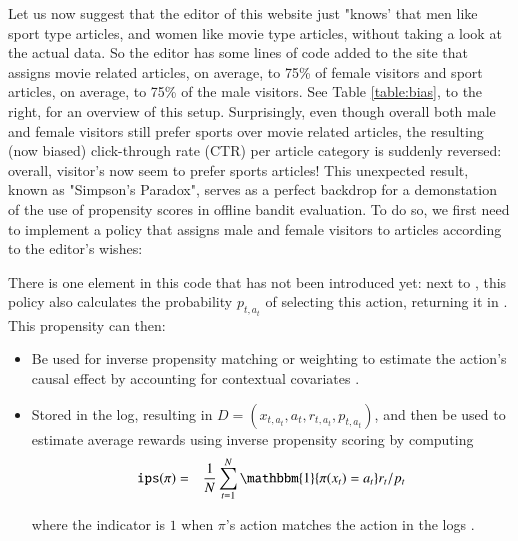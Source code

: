 \documentclass{jss}
\begin{document}
Let us now suggest that the editor of this website just "knows' that men like sport type articles, and women like movie type articles, without taking a look at the actual data. So the editor has some lines of code added to the site that assigns movie related articles, on average, to 75\% of female visitors and sport articles, on average, to 75\% of the male visitors. See Table \ref{table:bias}, to the right, for an overview of this setup. Surprisingly, even though overall both male and female visitors still prefer sports over movie related articles, the resulting (now biased) click-through rate (CTR) per article category is suddenly reversed: overall, visitor's now seem to prefer sports articles! This unexpected result, known as "Simpson's Paradox", serves as a perfect backdrop for a demonstation of the use of propensity scores in offline bandit evaluation. To do so, we first need to implement a policy that assigns male and female visitors to articles according to the editor's wishes:


There is one element in this code that has not been introduced yet: next to , this policy also calculates the probability $p_{t,a_t}$ of selecting this action, returning it in . This propensity can then:


\begin{itemize}
 \item{Be used for inverse propensity matching or weighting \cite{Austin2011} to estimate the action's causal effect by accounting for contextual covariates \citep{Imbens2015,Pearl2009}. }

 \item{Stored in the log, resulting in \( D = (x_{t,a_t},a_{t},r_{t,a_t},p_{t,a_t}) \), and then be used to estimate average rewards using inverse propensity scoring \citep{Horvitz1952} by computing
\begin{eqnarray}
\texttt{ips}(\pi) & = & \frac{1}{N} \sum_{t=1}^{N} \mathbbm{1} \{ \pi(x_t) = a_t \} r_t / p_t
\end{eqnarray}

where the indicator is $1$ when $\pi$'s action matches the action in the logs \citep{kruijswijk2018streamingbandit}.}

\end{itemize}
\end{document}
